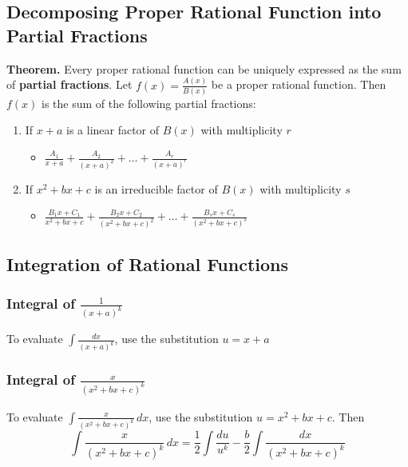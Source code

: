 \documentclass[../ma2002_notes.tex]{subfiles}
\begin{document}
\subsection{Decomposing Proper Rational Function into Partial Fractions}
\textbf{Theorem.} Every proper rational function can be uniquely expressed as the sum of \textbf{partial fractions}. Let \(f(x)=\frac{A(x)}{B(x)}\) be a proper rational function. Then \(f(x)\) is the sum of the following partial fractions:
\begin{enumerate}
	\item If \(x+a\) is a linear factor of \(B(x)\) with multiplicity \(r\)
	\begin{itemize}
		\item\(\displaystyle\frac{A_1}{x+a}+\frac{A_2}{(x+a)^2}+\ldots+\frac{A_r}{(x+a)^r}\)
	\end{itemize}
	\item If \(x^2+bx+c\) is an irreducible factor of \(B(x)\) with multiplicity \(s\)
	\begin{itemize}
		\item\(\displaystyle\frac{B_1x+C_1}{x^2+bx+c}+\frac{B_2x+C_2}{(x^2+bx+c)^2}+\ldots+\frac{B_sx+C_s}{(x^2+bx+c)^s}\)
	\end{itemize}
\end{enumerate}

\subsection{Integration of Rational Functions}
\subsubsection{Integral of $\frac{1}{(x+a)^k}$}
To evaluate \(\displaystyle\int\frac{dx}{(x+a)^k}\), use the substitution \(u=x+a\)

\subsubsection{Integral of $\frac{x}{(x^2+bx+c)^k}$}
To evaluate \(\displaystyle\int\frac{x}{(x^2+bx+c)^k}\,dx\), use the substitution \(u=x^2+bx+c\). Then
\[\int\frac{x}{(x^2+bx+c)^k}\,dx=\frac{1}{2}\int\frac{du}{u^k}-\frac{b}{2}\int\frac{dx}{(x^2+bx+c)^k}\]
\end{document}
